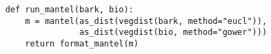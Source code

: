 \documentclass{article}
\begin{document}
\begin{verbatim}
    def run_mantel(bark, bio):
        m = mantel(as_dist(vegdist(bark, method="eucl")), 
                   as_dist(vegdist(bio, method="gower")))
        return format_mantel(m)
\end{verbatim}
\end{document}
